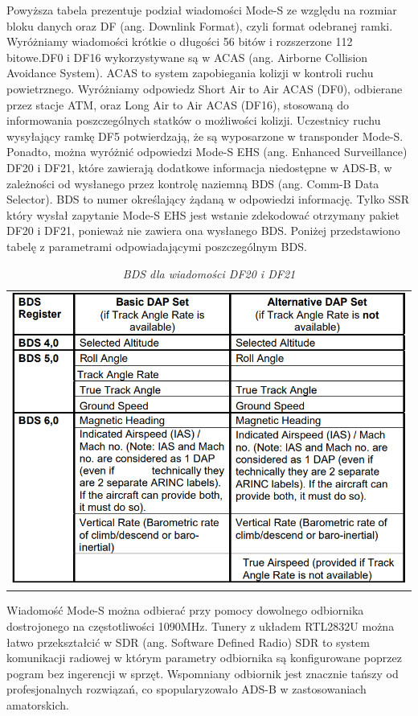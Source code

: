 \documentclass[eng,printmode]{mgr}
\begin{document}
Powyższa tabela prezentuje podział wiadomości Mode-S ze względu na rozmiar bloku danych oraz DF (ang. Downlink Format), czyli format odebranej ramki. Wyróżniamy wiadomości krótkie o długości 56 bitów i rozszerzone 112 bitowe.DF0 i DF16 wykorzystywane są w ACAS (ang. Airborne Collision Avoidance System). ACAS to system zapobiegania kolizji w kontroli ruchu powietrznego. Wyróżniamy odpowiedz Short Air to Air ACAS (DF0), odbierane przez stacje ATM, oraz Long Air to Air ACAS (DF16), stosowaną do informowania poszczególnych statków o możliwości kolizji. Uczestnicy ruchu wysyłający ramkę DF5 potwierdzają, że są wyposarzone w transponder Mode-S. Ponadto, można wyróżnić odpowiedzi Mode-S EHS (ang. Enhanced Surveillance) DF20 i DF21, które zawierają dodatkowe informacja niedostępne w ADS-B, w zależności od wysłanego przez kontrolę naziemną BDS (ang. Comm-B Data Selector). BDS to numer określający żądaną w odpowiedzi informację. Tylko SSR który wysłał zapytanie Mode-S EHS jest wstanie zdekodować otrzymany pakiet DF20 i DF21, ponieważ nie zawiera ona wysłanego BDS. Poniżej przedstawiono tabelę z parametrami odpowiadającymi poszczególnym BDS.
\begin{table}[ph]
\caption{\textit{ BDS dla wiadomości DF20 i DF21}}

  \centering
  \begin{tabular}{l}
  \\
    \includegraphics[width=\textwidth]{images/bds.png}
 \end{tabular}
\end{table}

Wiadomość Mode-S można odbierać przy pomocy dowolnego odbiornika dostrojonego na częstotliwości 1090MHz. Tunery z układem RTL2832U można łatwo przekształcić w SDR (ang. Software Defined Radio) SDR to system komunikacji radiowej w którym parametry odbiornika są konfigurowane poprzez pogram bez ingerencji w sprzęt. Wspomniany odbiornik jest znacznie tańszy od profesjonalnych rozwiązań, co spopularyzowało ADS-B w zastosowaniach amatorskich. 
\end{document}
